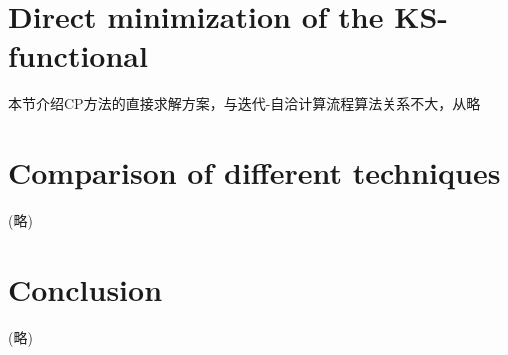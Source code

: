 \documentclass[14pt]{article}      %
\begin{document}
\section{Direct minimization of the KS-functional}
本节介绍\textrm{CP}方法的直接求解方案，与迭代-自洽计算流程算法关系不大，从略
\section{Comparison of different techniques}
(略)
\section{Conclusion}
(略)



\end{document}

